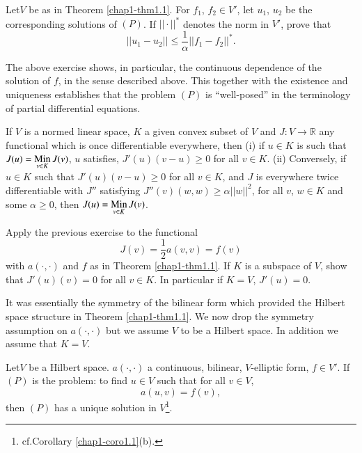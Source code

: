 \begin{exercise}\label{chap1-exer1.1}
Let\pageoriginale $V$ be as in Theorem \ref{chap1-thm1.1}. For
$f_{1}$, $f_{2}\in V'$, let $u_{1}$, $u_{2}$ be the corresponding
solutions of $(P)$. If $||\cdot ||^{\ast}$ denotes the norm in $V'$,
prove that
\begin{equation*}
||u_{1}-u_{2}||\leq \frac{1}{\alpha}||f_{1}-f_{2}||^{\ast}.
\end{equation*}
\end{exercise}

\begin{remark}\label{chap1-rem1.4}
The above exercise shows, in particular, the continuous dependence of
the solution of $f$, in the sense described above. This together with
the existence and uniqueness establishes that the problem $(P)$ is
``well-posed'' in the terminology of partial differential equations.
\end{remark}

\begin{exercise}\label{chap1-exer1.2}
If $V$ is a normed linear space, $K$ a given convex subset of $V$ and
$J:V\to \mathbb{R}$ any functional which is once differentiable
everywhere, then (i) if $u\in K$ is such that $J(u)=\operatorname*{Min}\limits_{v\in
  K}J(v)$, $u$ satisfies, $J'(u)(v-u)\geq 0$ for all $v\in K$. (ii)
Conversely, if $u\in K$ such that $J'(u)(v-u)\geq 0$ for all $v\in K$,
and $J$ is everywhere twice differentiable with $J''$ satisfying
$J''(v)(w,w)\geq \alpha ||w||^{2}$, for all $v$, $w\in K$ and some
$\alpha\geq 0$, then $J(u)=\operatorname*{Min}\limits_{v\in K}J(v)$.
\end{exercise}

\begin{exercise}[${}^1$]\label{chap1-exer1.3}
Apply the previous exercise to the functional
$$
J(v)=\frac{1}{2}a(v,v)=f(v)
$$
with $a(\cdot,\cdot)$ and $f$ as in Theorem \ref{chap1-thm1.1}. If $K$
is a subspace of $V$, show that $J'(u)(v)=0$ for all $v\in K$. In
particular if $K=V$, $J'(u)=0$.
\end{exercise}

It was essentially the symmetry of the bilinear form which provided
the Hilbert space structure in Theorem \ref{chap1-thm1.1}. We now drop
the symmetry assumption on $a(\cdot,\cdot)$ but we assume $V$ to be a
Hilbert space. In addition we assume that $K=V$.

\begin{theorem}\label{chap1-thm1.2}
Let\pageoriginale $V$ be a Hilbert space. $a(\cdot,\cdot)$ a
continuous, bilinear, $V$-elliptic form, $f\in V'$. If $(P)$ is the
problem: to find $u\in V$ such that for all $v\in V$,
\begin{equation*}
a(u,v)=f(v),\tag{1.11}\label{chap1-eq1.11}
\end{equation*}
then $(P)$ has a unique solution in $V$\footnote[1]{cf.\@ Corollary
  \ref{chap1-coro1.1}(b).}. 
\end{theorem}

